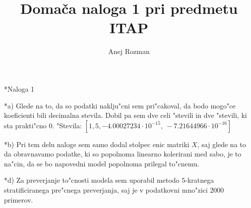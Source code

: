 \documentclass[a4paper, 10pt]{article}
\begin{document}
\title{Domača naloga 1 pri predmetu ITAP}
\author{Anej Rozman}
\date{}
\maketitle

\begin{subsection}*{Naloga 1}

    \begin{subsubsection}*{a)}
        Glede na to, da so podatki naklju"cni sem pri"cakoval, da bodo mogo"ce koeficienti bili 
        decimalna stevila. Dobil pa sem dve celi "stevili in dve "stevili, ki sta prakti"cno $0$. 
        \newline
        "Stevila: $[ 1,   5, -4.00027234\cdot 10^{-15}, \ -7.21644966\cdot10^{-16}]$
    \end{subsubsection}

    \begin{subsubsection}*{b)}
        Pri tem delu naloge sem samo dodal stolpec enic matriki $X$, saj glede na to da obravnavamo 
        podatke, ki so popolnoma linearno kolerirani med sabo, je to na"cin, da se bo napovedni model
        popolnoma prilegal to"cnemu.
    \end{subsubsection}

    \begin{subsubsection}*{d)}
        Za preverjanje to"cnosti modela sem uporabil metodo $5$-kratnega stratificiranega
         pre"cnega preverjanja, saj je v podatkovni mno"zici $2000$ primerov.
    \end{subsubsection}

\end{subsection}
\end{document}
